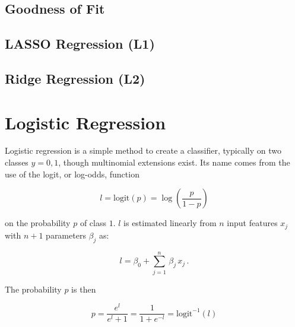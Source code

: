 \subsection{Goodness of Fit}
\label{regression:linear:goodness_of_fit}

\subsection{LASSO Regression (L1)}
\label{regression:linear:lasso}

\subsection{Ridge Regression (L2)}
\label{regression:linear:ridge}

\section{Logistic Regression}
\label{regression:logistic}

Logistic regression is a simple method to create a classifier,
typically on two classes $y = 0,1$, though multinomial extensions exist.
Its name comes from the use of the logit, or log-odds, function

\begin{equation}\label{eq:logistic:logic}
l = \text{logit}\left(p\right) = \log\left(\frac{p}{1-p}\right)
\end{equation}

\noindent on the probability $p$ of class $1$.
$l$ is estimated linearly from $n$ input features $x_{j}$ with $n+1$ parameters $\beta_{j}$ as:

\begin{equation}\label{eq:logistic:logicBeta}
l = \beta_{0} + \sum_{j=1}^{n} \, \beta_{j}\,x_{j}\,.
\end{equation}

\noindent The probability $p$ is then

\begin{equation}\label{eq:logistic:p}
p = \frac{e^l}{e^l + 1} = \frac{1}{1+e^{-l}} = \text{logit}^{-1}\left(l\right)
\end{equation}


